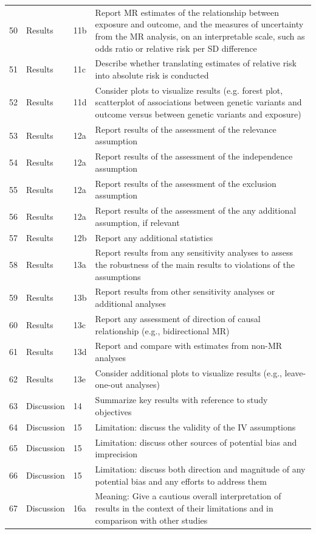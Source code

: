 \begin{longtable}{@{}lll p{9cm}@{}}
50 & Results & 11b & Report MR estimates of the relationship between exposure and outcome, and the measures of uncertainty from the MR analysis, on an interpretable scale, such as odds ratio or relative risk per SD difference \\
51 & Results & 11c & Describe whether translating estimates of relative risk into absolute risk is conducted \\
52 & Results & 11d & Consider plots to visualize results (e.g. forest plot, scatterplot of associations between genetic variants and outcome versus between genetic variants and exposure) \\
53 & Results & 12a & Report results of the assessment of the relevance assumption \\
54 & Results & 12a & Report results of the assessment of the independence assumption \\
55 & Results & 12a & Report results of the assessment of the exclusion assumption \\
56 & Results & 12a & Report results of the assessment of the any additional assumption, if relevant  \\
57 & Results & 12b & Report any additional statistics \\
58 & Results & 13a & Report results from any sensitivity analyses to assess the robustness of the main results to violations of the assumptions \\
59 & Results & 13b & Report results from other sensitivity analyses or additional analyses \\
60 & Results & 13c & Report any assessment of direction of causal relationship (e.g., bidirectional MR) \\
61 & Results & 13d & Report and compare with estimates from non-MR analyses \\
62 & Results & 13e & Consider additional plots to visualize results (e.g., leave-one-out analyses) \\
63 & Discussion & 14 & Summarize key results with reference to study objectives \\
64 & Discussion & 15 & Limitation: discuss the validity of the IV assumptions \\
65 & Discussion & 15 & Limitation: discuss other sources of potential bias and imprecision \\
66 & Discussion & 15 & Limitation: discuss both direction and magnitude of any potential bias and any efforts to address them \\
67 & Discussion & 16a & Meaning: Give a cautious overall interpretation of results in the context of their limitations and in comparison with other studies \\

\end{longtable}
